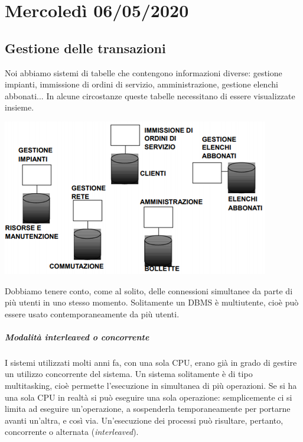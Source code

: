 \chapter{Mercoledì 06/05/2020}
\section{Gestione delle transazioni}
Noi abbiamo sistemi di tabelle che contengono informazioni diverse: gestione impianti, immissione di ordini di servizio, amministrazione, gestione elenchi abbonati... In alcune circostanze queste tabelle necessitano di essere visualizzate insieme.
\begin{center}
	\includegraphics{images/131.PNG}
\end{center}
Dobbiamo tenere conto, come al solito, delle connessioni simultanee da parte di più utenti in uno stesso momento.  Solitamente un DBMS è multiutente, cioè può essere usato contemporaneamente da più utenti.
\paragraph{Modalità interleaved o concorrente}  I sistemi utilizzati molti anni fa, con una sola CPU, erano già in grado di gestire un utilizzo concorrente del sistema. Un sistema solitamente è di tipo multitasking, cioè permette l'esecuzione in simultanea di più operazioni. Se si ha una sola CPU in realtà si può eseguire una sola operazione: semplicemente ci si limita ad eseguire un'operazione, a sospenderla temporaneamente per portarne avanti un'altra, e così via.
Un'esecuzione dei processi può risultare, pertanto, concorrente o alternata (\emph{interleaved}).

